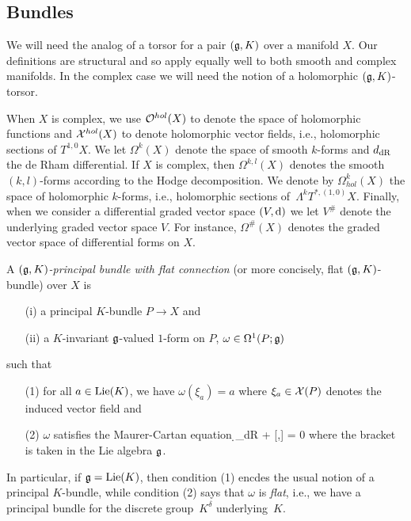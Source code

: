 \subsection{Bundles}

We will need the analog of a torsor for a pair $(\mathfrak g,K)$ over a manifold $X$.
Our definitions are structural and so apply equally well to both
smooth and complex manifolds. In the complex case we will need
the notion of a holomorphic $(\mathfrak g,K)$-torsor. 

When $X$ is complex, we use $\mathcal O^{hol}(X)$ to denote the space of
holomorphic functions and $\mathcal X^{hol}(X)$ to denote holomorphic vector fields, 
i.e., holomorphic sections of $T^{1,0}X$. 
We let $\Omega^k(X)$ denote the space of smooth $k$-forms and $d_{\operatorname{dR}}$ the de Rham differential. 
If $X$ is complex, then $\Omega^{k,l}(X)$ denotes the smooth $(k,l)$-forms according to the Hodge decomposition. 
We denote by $\Omega^k_{hol}(X)$ the space of holomorphic $k$-forms,
i.e., holomorphic sections of~$\Lambda^k T^{*,(1,0)}X$. Finally, when
we consider a differential graded vector space $(V,{\rm d})$ we let $V^\#$
denote the underlying graded vector space $V$. For instance,
$\Omega^\#(X)$ denotes the graded vector space of differential forms on $X$. 

\begin{dfn} \label{gkbun}
A {\em $(\mathfrak g,K)$-principal bundle with flat connection} (or more concisely, flat $(\mathfrak g,K)$-bundle) over $X$ is 
\begin{itemize}
\item[(i)] a principal $K$-bundle $P \to X$ and
\item[(ii)] a $K$-invariant $\mathfrak g$-valued $1$-form on $P$, $\omega \in \Omega^1(P; \mathfrak g)$
\end{itemize}
such that 
\begin{itemize}
\item[(1)] for all $a \in {\rm Lie}(K)$, we have $\omega(\xi_a) = a$ where $\xi_a \in \mathcal X(P)$ denotes the induced vector field and 
\item[(2)] $\omega$ satisfies the Maurer-Cartan equation
\ben
\d_{dR} \omega + [\omega,\omega] = 0
\een
where the bracket is taken in the Lie algebra $\mathfrak g$. 
\end{itemize}
\end{dfn}

In particular, if $\mathfrak g = {\rm Lie}(K)$, then condition (1) encdes the usual notion of a principal $K$-bundle, while condition (2) says that $\omega$ is {\em flat}, i.e., we have a principal bundle for the discrete group~$K^\delta$ underlying~$K$. 

